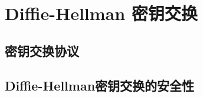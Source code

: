 \section{Diffie-Hellman 密钥交换}\label{sec:10-4}

\subsection{密钥交换协议}\label{subsec:10-4-1}

\subsection{Diffie-Hellman密钥交换的安全性}\label{subsec:10-4-2}